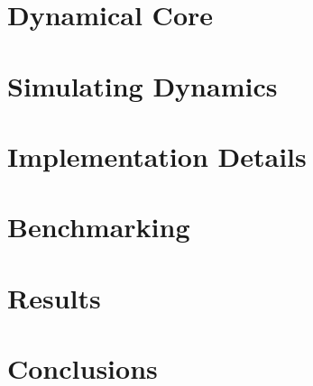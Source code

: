 \documentclass[hidelinks, 12pt]{style}
\begin{document}
\chapter{Dynamical Core}\label{3}


\chapter{Simulating Dynamics}\label{4}


\chapter{Implementation Details}\label{5}


\chapter{Benchmarking}\label{6}


\chapter{Results}\label{7}


\chapter{Conclusions}\label{8}


\newpage


\appendix
\renewcommand{\thesection}{\Alph{section}.\arabic{section}}
\setcounter{section}{0}



\printbibliography[heading = bibintoc]
\end{document}
